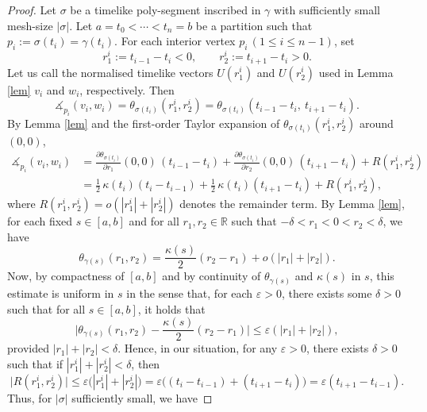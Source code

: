 \documentclass[hidelinks,12pt,a4paper]{article}
\numberwithin{equation}{section}
\theoremstyle{plain}
\theoremstyle{definition}
\newcommand{\R}{\mathbb R}
\newcommand{\eps}{\varepsilon}
\newcommand{\ma}{\ensuremath{\measuredangle}}
\begin{document}
\begin{proof}
Let $\sigma$ be a timelike poly-segment inscribed in $\gamma$ with sufficiently small mesh-size $|\sigma|$. Let $a=t_0<\cdots<t_n=b$ be a partition such that $p_i:=\sigma(t_i)=\gamma(t_i)$. For each interior vertex $p_i \,(1\le i\le n-1)$, set
\begin{equation*}
r^i_1:=t_{i-1}-t_i<0,\qquad r^i_2:=t_{i+1}-t_i>0.
\end{equation*}
Let us call the normalised timelike vectors $U(r^i_1)$ and $U(r^i_2)$ used in Lemma \ref{lem} $v_i$ and $w_i$, respectively. 
Then
\begin{equation*}
\ma_{p_i}(v_i, w_i)=\theta_{\sigma(t_i)}(r^i_1,r^i_2)=\theta_{\sigma(t_i)}(t_{i-1}-t_i,\ t_{i+1}-t_i).
\end{equation*}
By Lemma \ref{lem} and the first-order Taylor expansion of $\theta_{\sigma(t_i)}(r^i_1,r^i_2)$ around $(0,0)$,
\begin{align*}
\ma_{p_i}(v_i, w_i)
&=\frac{\partial\theta_{\sigma(t_i)}}{\partial r_1}(0,0)\,(t_{i-1}-t_i)
+\frac{\partial\theta_{\sigma(t_i)}}{\partial r_2}(0,0)\,(t_{i+1}-t_i)
+R(r^i_1,r^i_2)\\
&=\frac12\,\kappa(t_i)(t_i-t_{i-1})
+\frac12\,\kappa(t_i)(t_{i+1}-t_i)
+R(r^i_1,r^i_2),
\end{align*}
where $R(r^i_1,r^i_2) = o(|r_1^{i}|+|r_2^{i}|)$ denotes the remainder term.
By Lemma \ref{lem}, for each fixed $s \in [a,b]$ and for all $r_1, r_2 \in \R$ such that $-\delta < r_1 < 0 < r_2 < \delta$, we have 
\begin{equation*}
\theta_{\gamma(s)}(r_1,r_2) = \frac{\kappa(s)}{2}(r_2-r_1) + o(|r_1| + |r_2|).
\end{equation*}
Now, by compactness of $[a,b]$ and by continuity of $\theta_{\gamma(s)}$ and $\kappa(s)$ in $s$, this estimate is uniform in $s$ in the sense that, for each $\eps >0$, there exists some $\delta >0$ such that for all $s \in [a,b]$, it holds that
\begin{equation*}
\biggl|\theta_{\gamma(s)}(r_1,r_2) - \frac{\kappa(s)}{2}(r_2-r_1)\biggr| \leq \eps (|r_1|+|r_2|),
\end{equation*}
provided $|r_1| + |r_2| < \delta$. Hence, in our situation, 
for any $\eps>0$, there exists $\delta>0$ such that if $|r^i_1|+|r^i_2|<\delta$, then
\begin{equation*}
\big|R(r^i_1,r^i_2)\big|\leq \eps\big(|r_1^{i}|+|r_2^{i}|\big)
=\eps\bigl((t_i-t_{i-1})+(t_{i+1}-t_i)\bigr)
=\eps(t_{i+1}-t_{i-1}).
\end{equation*}
Thus, for $|\sigma|$ sufficiently small, we have 

\end{proof}
\end{document}
